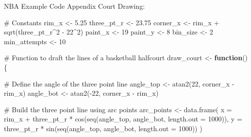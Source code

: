 \documentclass[
  9pt,
  ignorenonframetext,
  aspectratio=169]{beamer}
\author{}
\date{\vspace{-2.5em}}
\newenvironment{Shaded}{\begin{snugshade}}{\end{snugshade}}
\newcommand{\AttributeTok}[1]{\textcolor[rgb]{0.00,0.34,0.68}{#1}}
\newcommand{\CommentTok}[1]{\textcolor[rgb]{0.54,0.53,0.53}{#1}}
\newcommand{\ControlFlowTok}[1]{\textcolor[rgb]{0.12,0.11,0.11}{\textbf{#1}}}
\newcommand{\DecValTok}[1]{\textcolor[rgb]{0.69,0.50,0.00}{#1}}
\newcommand{\FloatTok}[1]{\textcolor[rgb]{0.69,0.50,0.00}{#1}}
\newcommand{\FunctionTok}[1]{\textcolor[rgb]{0.39,0.29,0.61}{#1}}
\newcommand{\NormalTok}[1]{\textcolor[rgb]{0.12,0.11,0.11}{#1}}
\newcommand{\OtherTok}[1]{\textcolor[rgb]{0.00,0.43,0.16}{#1}}
\newcommand{\SpecialCharTok}[1]{\textcolor[rgb]{0.24,0.68,0.91}{#1}}
\begin{document}
\begin{frame}[fragile]{NBA Example Code Appendix}
\label{nba-example-code-appendix}
Court Drawing:

\begin{Shaded}
\begin{Highlighting}[]
\CommentTok{\# Constants}
\NormalTok{rim\_x }\OtherTok{\textless{}{-}} \FloatTok{5.25}
\NormalTok{three\_pt\_r }\OtherTok{\textless{}{-}} \FloatTok{23.75}
\NormalTok{corner\_x }\OtherTok{\textless{}{-}}\NormalTok{ rim\_x }\SpecialCharTok{+} \FunctionTok{sqrt}\NormalTok{(three\_pt\_r}\SpecialCharTok{\^{}}\DecValTok{2} \SpecialCharTok{{-}} \DecValTok{22}\SpecialCharTok{\^{}}\DecValTok{2}\NormalTok{)}
\NormalTok{paint\_x }\OtherTok{\textless{}{-}} \DecValTok{19}
\NormalTok{paint\_y }\OtherTok{\textless{}{-}} \DecValTok{8}
\NormalTok{bin\_size }\OtherTok{\textless{}{-}} \DecValTok{2}
\NormalTok{min\_attempts }\OtherTok{\textless{}{-}} \DecValTok{10}

\CommentTok{\# Function to draft the lines of a basketball halfcourt}
\NormalTok{draw\_court }\OtherTok{\textless{}{-}} \ControlFlowTok{function}\NormalTok{() \{}
  
  \CommentTok{\# Define the angle of the three point line}
\NormalTok{  angle\_top }\OtherTok{\textless{}{-}} \FunctionTok{atan2}\NormalTok{(}\DecValTok{22}\NormalTok{, corner\_x }\SpecialCharTok{{-}}\NormalTok{ rim\_x)}
\NormalTok{  angle\_bot }\OtherTok{\textless{}{-}} \FunctionTok{atan2}\NormalTok{(}\SpecialCharTok{{-}}\DecValTok{22}\NormalTok{, corner\_x }\SpecialCharTok{{-}}\NormalTok{ rim\_x)}
  
  \CommentTok{\# Build the three point line using arc points}
\NormalTok{  arc\_points }\OtherTok{\textless{}{-}} \FunctionTok{data.frame}\NormalTok{(}
    \AttributeTok{x =}\NormalTok{ rim\_x }\SpecialCharTok{+}\NormalTok{ three\_pt\_r }\SpecialCharTok{*} \FunctionTok{cos}\NormalTok{(}\FunctionTok{seq}\NormalTok{(angle\_top, angle\_bot, }\AttributeTok{length.out =} \DecValTok{1000}\NormalTok{)),}
    \AttributeTok{y =}\NormalTok{ three\_pt\_r }\SpecialCharTok{*} \FunctionTok{sin}\NormalTok{(}\FunctionTok{seq}\NormalTok{(angle\_top, angle\_bot, }\AttributeTok{length.out =} \DecValTok{1000}\NormalTok{))}
\NormalTok{  )}
\end{Highlighting}
\end{Shaded}
\end{frame}
\end{document}
